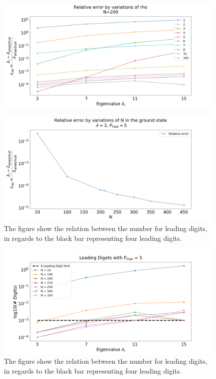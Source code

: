 \documentclass[%
reprint,
amsmath,amssymb,
aps,
]{revtex4-1}
\begin{document}
\begin{figure}[!h]
	\includegraphics[scale = 0.3]{N_200_relative_error.png}
	\caption{\label{fig:2D200}}
\end{figure}
\begin{figure}[!h]
	\includegraphics[scale = 0.3]{Relative_error_rho_5.png}
	\caption{\label{fig:RE} The figure show the relation between the number for leading digits, in regards to the black bar representing four leading digits.}
\end{figure}
\begin{figure}[!h]
	\includegraphics[scale = 0.3]{Leading_digits.png}
	\caption{\label{fig:LD} The figure show the relation between the number for leading digits, in regards to the black bar representing four leading digits.}
\end{figure}
\end{document}
